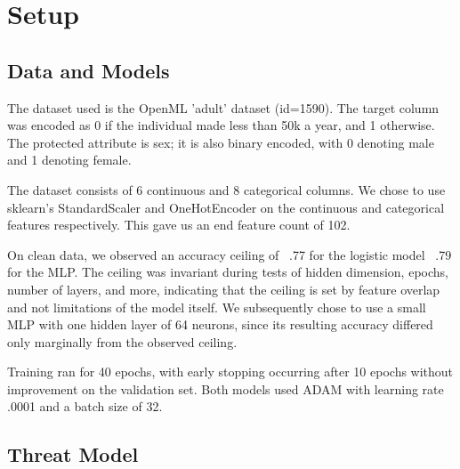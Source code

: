 \documentclass[11pt]{article}
\begin{document}
\section{Setup}\label{sec:setup}

\subsection{Data and Models}

The dataset used is the OpenML 'adult' dataset (id=1590). The target column was encoded as 0 if the individual made less than 50k a year, and 1 otherwise. The protected attribute is sex; it is also binary encoded, with 0 denoting male and 1 denoting female. 


The dataset consists of 6 continuous and 8 categorical columns. We chose to use sklearn's StandardScaler and OneHotEncoder on the continuous and categorical features respectively. This gave us an end feature count of 102. 

On clean data, we observed an accuracy ceiling of ~.77 for the logistic model ~.79 for the MLP. The ceiling was invariant during tests of hidden dimension, epochs, number of layers, and more, indicating that the ceiling is set by feature overlap and not limitations of the model itself. We subsequently chose to use a small MLP with one hidden layer of 64 neurons, since its resulting accuracy differed only marginally from the observed ceiling.

Training ran for 40 epochs, with early stopping occurring after 10 epochs without improvement on the validation set. Both models used ADAM with learning rate .0001 and a batch size of 32.

\subsection{Threat Model}
\end{document}
